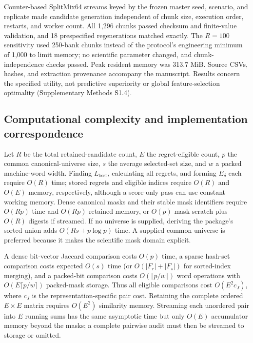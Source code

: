 Counter-based SplitMix64 streams keyed by the frozen master seed, scenario, and replicate made candidate generation independent of chunk size, execution order, restarts, and worker count. All 1,296 chunks passed checksum and finite-value validation, and 18 prespecified regenerations matched exactly. The $R=100$ sensitivity used 250-bank chunks instead of the protocol's engineering minimum of 1,000 to limit memory; no scientific parameter changed, and chunk-independence checks passed. Peak resident memory was 313.7 MiB. Source CSVs, hashes, and extraction provenance accompany the manuscript. Results concern the specified utility, not predictive superiority or global feature-selection optimality (Supplementary Methods S1.4).

\subsection{Computational complexity and implementation correspondence}

Let $R$ be the total retained-candidate count, $E$ the regret-eligible count, $p$ the common canonical-universe size, $s$ the average selected-set size, and $w$ a packed machine-word width. Finding $L_{\mathrm{best}}$, calculating all regrets, and forming $E_\delta$ each require $O(R)$ time; stored regrets and eligible indices require $O(R)$ and $O(E)$ memory, respectively, although a score-only pass can use constant working memory. Dense canonical masks and their stable mask identifiers require $O(Rp)$ time and $O(Rp)$ retained memory, or $O(p)$ mask scratch plus $O(R)$ digests if streamed. If no universe is supplied, deriving the package's sorted union adds $O(Rs+p\log p)$ time. A supplied common universe is preferred because it makes the scientific mask domain explicit.

A dense bit-vector Jaccard comparison costs $O(p)$ time, a sparse hash-set comparison costs expected $O(s)$ time (or $O(|F_r|+|F_s|)$ for sorted-index merging), and a packed-bit comparison costs $O(\lceil p/w\rceil)$ word operations with $O(E\lceil p/w\rceil)$ packed-mask storage. Thus all eligible comparisons cost $O(E^2c_J)$, where $c_J$ is the representation-specific pair cost. Retaining the complete ordered $E\times E$ matrix requires $O(E^2)$ similarity memory. Streaming each unordered pair into $E$ running sums has the same asymptotic time but only $O(E)$ accumulator memory beyond the masks; a complete pairwise audit must then be streamed to storage or omitted.

